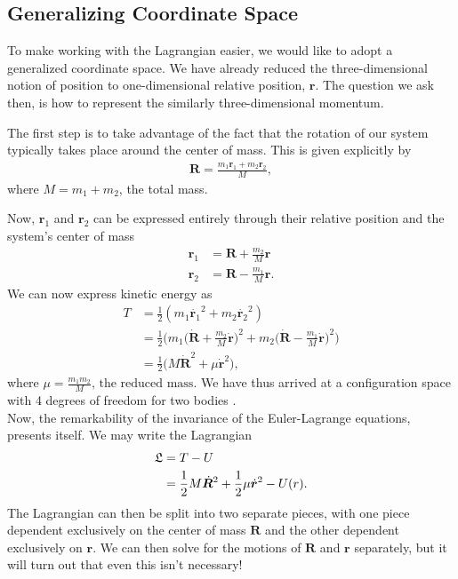 \documentclass[10pt, psamsfonts]{amsart}
\theoremstyle{definition}
\theoremstyle{remark}
\numberwithin{equation}{section}
\begin{document}
\subsection{Generalizing Coordinate Space} To make working with the Lagrangian
easier, we would like to adopt a generalized coordinate space. We have already
reduced the three-dimensional notion of position to one-dimensional relative
position, $\bm{r}$. The question we ask then, is how to represent the similarly
three-dimensional momentum. 

The first step is to take advantage of the fact that the rotation of our system typically takes place around the center of mass. This is given explicitly by
\begin{align*}
  \bm{R} = \frac{m_1 \bm{r}_1 + m_2 \bm{r}_2}{M},
\end{align*}
where $M = m_1 + m_2$, the total mass.

\noindent Now, $\bm{r}_1$ and $\bm{r}_2$ can be expressed entirely through their relative position and the system's center of mass
\begin{align*}
  \bm{r}_1 &= \bm{R} + \frac{m_2}{M} \bm{r} \\
  \bm{r}_2 &= \bm{R} - \frac{m_1}{M} \bm{r}.
\end{align*}
\noindent We can now express kinetic energy as
\begin{align*}
  T & = \frac{1}{2} (m_1 \dot{\bm{r}_1}^2 + m_2 \dot{\bm{r}_2}^2) \\
    & = \frac{1}{2} \bigg(m_1 \bigg(\dot{\bm{R}}+\frac{m_2}{M} \dot{\bm{r}}\bigg)^2 + m_2 \bigg(\dot{\bm{R}} - \frac{m_1}{M} \dot{\bm{r}} \bigg)^2 \bigg)\\
    & = \frac{1}{2} \bigg( M \dot{\bm{R}}^2 + \mu\dot{\bm{r}}^2 \bigg),
\end{align*}
where $\mu = \frac{m_1 m_2}{M} \text{, the reduced mass} $.
We have thus arrived at a configuration space with 4 degrees of freedom for two bodies \cite{3}.\\

Now, the remarkability of the invariance of the Euler-Lagrange equations, presents itself. We may write the Lagrangian
\begin{align}
  \label{eq:TB Lagrangian}
  \mathfrak{L} &= T - U \notag \\
               &= \frac{1}{2} M \dot{\bm{R}}^2 + \frac{1}{2} \mu\dot{\bm{r}}^2 - U(r). 
\end{align}
The Lagrangian can then be split into two separate pieces, with one piece dependent exclusively on the center of mass $\bm{R}$ and the other dependent exclusively on $\bm{r}$. We can then solve for the motions of $\bm{R}$ and $\bm{r}$ separately, but it will turn out that even this isn't necessary!
\end{document}
